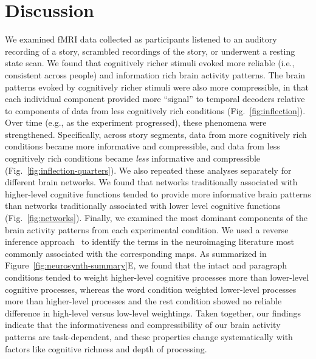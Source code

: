 \documentclass[english, 11pt]{article}
\begin{document}
\section*{Discussion}

We examined fMRI data collected as participants listened to an auditory
recording of a story, scrambled recordings of the story, or underwent a resting
state scan. We found that cognitively richer stimuli evoked more reliable
(i.e., consistent across people) and information rich brain activity patterns.
The brain patterns evoked by cognitively richer stimuli were also more
compressible, in that each individual component provided more ``signal'' to
temporal decoders relative to components of data from less cognitively rich
conditions (Fig.~\ref{fig:inflection}). Over time (e.g., as the experiment
progressed), these phenomena were strengthened. Specifically, across story
segments, data from more cognitively rich conditions became more informative
and compressible, and data from less cognitively rich conditions became
\textit{less} informative and compressible
(Fig.~\ref{fig:inflection-quarters}).  We also repeated these analyses
separately for different brain networks. We found that networks traditionally
associated with higher-level cognitive functions tended to provide more
informative brain patterns than networks traditionally associated with lower
level cognitive functions (Fig.~\ref{fig:networks}). Finally, we examined the
most dominant components of the brain activity patterns from each experimental
condition. We used a reverse inference approach~\citep{RubiEtal17} to identify
the terms in the neuroimaging literature most commonly associated with the
corresponding maps. As summarized in Figure~\ref{fig:neurosynth-summary}E, we
found that the intact and paragraph conditions tended to weight higher-level
cognitive processes more than lower-level cognitive processes, whereas the word
condition weighted lower-level processes more than higher-level processes
and the rest condition showed no reliable difference in high-level versus low-level
weightings. Taken together, our findings indicate that the informativeness and
compressibility of our brain activity patterns are task-dependent, and these
properties change systematically with factors like cognitive richness and depth
of processing.
\end{document}
